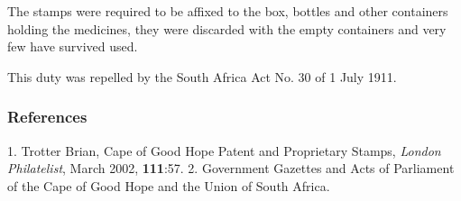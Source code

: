 The stamps were required to be affixed to the box, bottles and other containers holding the medicines, they were discarded with the empty containers and very few
have survived used.

This duty was repelled by the South Africa Act No. 30 of 1 July 1911.



\subsubsection{References}

1. Trotter Brian, Cape of Good Hope Patent and Proprietary Stamps, \textit{London Philatelist}, March 2002, \textbf{111}:57. 
2. Government Gazettes and Acts of Parliament of the Cape of Good Hope and the Union of South Africa.            